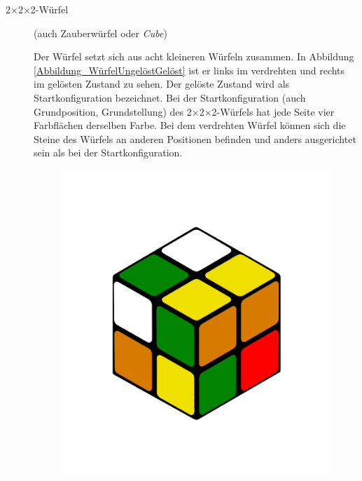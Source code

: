 \documentclass[12pt,a4paper, usenames, dvipsnames]{article}
\theoremstyle{mystyle}
\theoremstyle{definition}
\newcommand{\Ttwo}{2$\times$2$\times$2-}
\begin{document}
\begin{description}


\item[\Ttwo Würfel] (auch Zauberwürfel oder \textit{Cube}) 

Der Würfel setzt sich aus acht kleineren Würfeln zusammen.
In Abbildung \ref{Abbildung_WürfelUngelöstGelöst} ist er links im verdrehten und rechts im gelösten Zustand zu sehen. Der gelöste Zustand wird als Startkonfiguration bezeichnet.
Bei der Startkonfiguration (auch Grundposition, Grundstellung) des \Ttwo Würfels hat jede Seite vier Farbflächen derselben Farbe. 
Bei dem verdrehten Würfel können sich die Steine des Würfels an anderen Positionen befinden und anders ausgerichtet sein als bei der Startkonfiguration.
\begin{figure}[h]
\centering
\includegraphics[scale=0.1]{2x2scrambled.png}

\end{figure}
\end{description}
\end{document}
